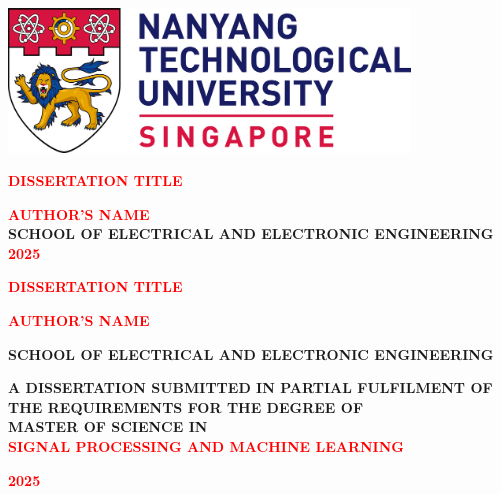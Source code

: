 \begin{titlepage}
    \centering
    
    \vspace*{1cm}
    
    \includegraphics[width=0.8\textwidth]{assets/ntu-logo.png} %
    
    \vspace*{6cm}
    
    \textbf{\LARGE{\textcolor{red}{DISSERTATION TITLE}}}
    
    \vfill
    
    \textbf{\textcolor{red}{AUTHOR'S NAME}} \\
    \textbf{SCHOOL OF ELECTRICAL AND ELECTRONIC ENGINEERING} \\
    \textbf{\textcolor{red}{2025}}

    \vspace*{1cm}

    \newpage
    
    \vspace*{6cm}
    
    \textbf{\LARGE{\textcolor{red}{DISSERTATION TITLE}}}

    \vspace*{6cm}

    \textbf{\textcolor{red}{AUTHOR’S NAME}}

    \vspace*{2cm}

    \textbf{SCHOOL OF ELECTRICAL AND ELECTRONIC ENGINEERING}

    \vspace*{\baselineskip}

    \textbf{A DISSERTATION SUBMITTED IN PARTIAL FULFILMENT OF THE REQUIREMENTS FOR THE DEGREE OF} \\
    \textbf{MASTER OF SCIENCE IN} \\
    \textbf{\textcolor{red}{SIGNAL PROCESSING AND MACHINE LEARNING}}

    \vfill

    \textbf{\textcolor{red}{2025}}

    \vspace*{1cm}
\end{titlepage}
